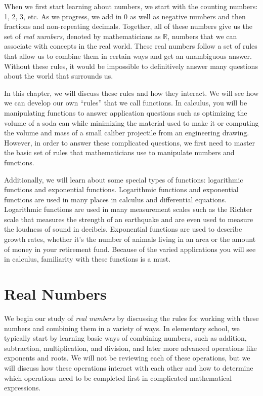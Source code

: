 When we first start learning about numbers, we start with the counting numbers: 1, 2, 3, etc. As we progress, we add in 0 as well as negative numbers and then fractions and non-repeating decimals. Together, all of these numbers give us the set of \textit{real numbers}, denoted by mathematicians as $\mathbb R$, numbers that we can associate with concepts in the real world. These real numbers follow a set of rules that allow us to combine them in certain ways and get an unambiguous answer. Without these rules, it would be impossible to definitively answer many questions about the world that surrounds us.

In this chapter, we will discuss these rules and how they interact. We will see how we can develop our own ``rules'' that we call functions. In calculus, you will be manipulating functions to answer application questions such as optimizing the volume of a soda can while minimizing the material used to make it or computing the volume and mass of a small caliber projectile from an engineering drawing. However, in order to answer these complicated questions, we first need to master the basic set of rules that mathematicians use to manipulate numbers and functions.

Additionally, we will learn about some special types of functions: logarithmic functions and exponential functions. Logarithmic functions and exponential functions are used in many places in calculus and differential equations. Logarithmic functions are used in many measurement scales such as the Richter scale that measures the strength of an earthquake and are even used to measure the loudness of sound in decibels. Exponential functions are used to describe growth rates, whether it's the number of animals living in an area or the amount of money in your retirement fund. Because of the varied applications you will see in calculus, familiarity with these functions is a must.



\section{Real Numbers}\label{sec:real_numbers}

We begin our study of \textit{real numbers} by discussing the rules for working with these numbers and combining them in a variety of ways. In elementary school, we typically start by learning basic ways of combining numbers, such as addition, subtraction, multiplication, and division, and later more advanced operations like exponents and roots. We will not be reviewing each of these operations, but we will discuss how these operations interact with each other and how to determine which operations need to be completed first in complicated mathematical expressions.

